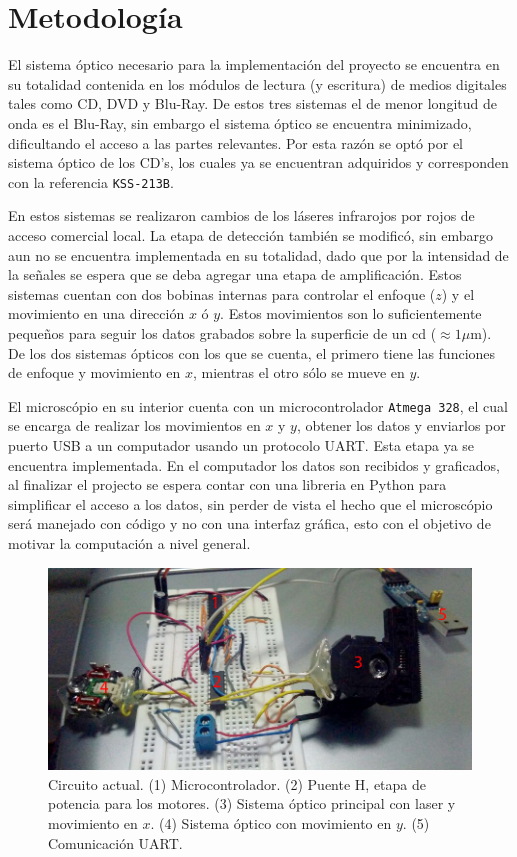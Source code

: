 \documentclass[10pt]{article}
\begin{document}
	\section{Metodolog\'ia}
		El sistema \'optico necesario para la implementaci\'on del proyecto se encuentra en su totalidad contenida en los m\'odulos de lectura (y escritura) de medios digitales tales como CD, DVD y Blu-Ray. De estos tres sistemas el de menor longitud de onda es el Blu-Ray, sin embargo el sistema \'optico se encuentra minimizado, dificultando el acceso a las partes relevantes. Por esta raz\'on se opt\'o por el sistema \'optico de los CD's, los cuales ya se encuentran adquiridos y corresponden con la referencia \texttt{KSS-213B}.
		
		En estos sistemas se realizaron cambios de los l\'aseres infrarojos por rojos de acceso comercial local. La etapa de detecci\'on tambi\'en se modific\'o, sin embargo aun no se encuentra implementada en su totalidad, dado que por la intensidad de la se\~nales se espera que se deba agregar una etapa de amplificaci\'on. Estos sistemas cuentan con dos bobinas internas para controlar el enfoque ($z$) y el movimiento en una direcci\'on $x$ \'o $y$. Estos movimientos son lo suficientemente peque\~nos para seguir los datos grabados sobre la superficie de un cd ($\approx 1\mu$m). De los dos sistemas \'opticos con los que se cuenta, el primero tiene las funciones de enfoque y movimiento en $x$, mientras el otro s\'olo se mueve en $y$.
		
		El microsc\'opio en su interior cuenta con un microcontrolador \texttt{Atmega 328}, el cual se encarga de realizar los movimientos en $x$ y $y$, obtener los datos y enviarlos por puerto USB a un computador usando un protocolo UART. Esta etapa ya se encuentra implementada. En el computador los datos son recibidos y graficados, al finalizar el projecto se espera contar con una libreria en Python para simplificar el acceso a los datos, sin perder de vista el hecho que el microsc\'opio ser\'a manejado con c\'odigo y no con una interfaz gr\'afica, esto con el objetivo de motivar la computaci\'on a nivel general.
		
		\begin{figure}[h]
			\centering
			\includegraphics[width=0.7\linewidth]{breadboard.jpg}
			\caption{Circuito actual. (1) Microcontrolador. (2) Puente H, etapa de potencia para los motores. (3) Sistema \'optico principal con laser y movimiento en $x$. (4) Sistema \'optico con movimiento en $y$. (5) Comunicaci\'on UART.}
		\end{figure}
		
\end{document}
